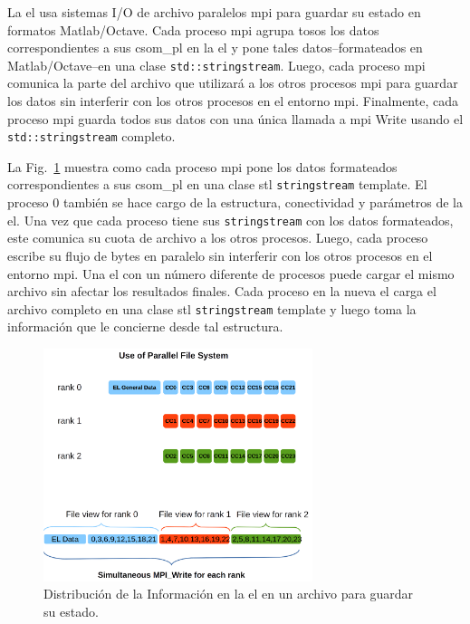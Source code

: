 {La \gls{el} usa sistemas I/O de archivo paralelos \gls{mpi} para guardar su estado en formatos Matlab/Octave.
Cada proceso \gls{mpi} agrupa tosos los datos correspondientes a sus \gls{csom_pl} en la \gls{el} y pone tales datos--formateados en Matlab/Octave--en una clase \texttt{std::stringstream}.
Luego, cada proceso \gls{mpi} comunica la parte del archivo que utilizará a los otros procesos \gls{mpi} para guardar los datos sin interferir con los otros procesos en el entorno \gls{mpi}.
Finalmente, cada proceso \gls{mpi} guarda todos sus datos con una única llamada a \gls{mpi} Write usando el \texttt{std::stringstream} completo.

La Fig.~\ref{fig:MPI_IO} muestra como cada proceso \gls{mpi} pone los datos formateados correspondientes a sus \gls{csom_pl} en una clase \gls{stl} \texttt{stringstream} template.
El proceso 0 también se hace cargo de la estructura, conectividad y parámetros de la \gls{el}.
Una vez que cada proceso tiene sus \texttt{stringstream} con los datos formateados, este comunica su cuota de archivo a los otros procesos.
Luego, cada proceso escribe su flujo de bytes en paralelo sin interferir con los otros procesos en el entorno \gls{mpi}.
Una \gls{el} con un número diferente de procesos puede cargar el mismo archivo sin afectar los resultados finales.
Cada proceso en la nueva \gls{el} carga el archivo completo en una clase \gls{stl} \texttt{stringstream} template y luego toma la información que le concierne desde tal estructura.

\begin{figure}[h!]
    \centering
    \includegraphics[width=0.7\textwidth]{MPI_IO.png}
    \caption{Distribución de la Información en la \gls{el} en un archivo para guardar su estado.}
    \label{fig:MPI_IO}
\end{figure}

}
